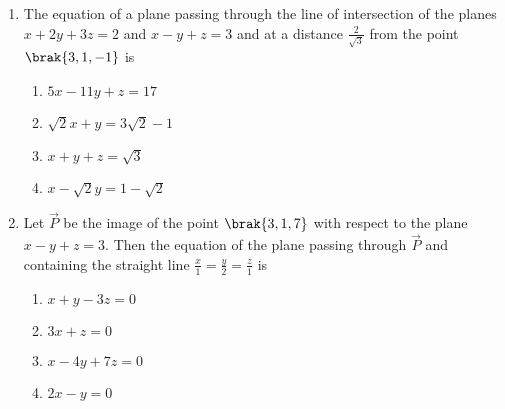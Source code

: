 \begin{enumerate}[label=\thesubsection.\arabic*.,ref=\thesubsection.\theenumi]
\begin{multicols}{4}
\begin{enumerate}
	\item $\frac{1}{\sqrt{2}}$           
	\item $\sqrt{2}$                   
        \item $2$           
	\item $2\sqrt{2}$
\end{enumerate}
\end{multicols}
         \item %
		 The equation of a plane passing through the line of intersection of the planes $x+2y+3z=2$ and $x-y+z=3$ and at a distance $\frac{2}{\sqrt{3}}$ from the point $\brak{3,1,-1}$ is 

		 \hfill{}
\begin{multicols}{2}
\begin{enumerate}
        \item $5x-11y+z=17$           
	\item $\sqrt{2}x+y=3\sqrt{2}-1$                   
	\item $x+y+z=\sqrt{3}$           
	\item $x-\sqrt{2}y=1-\sqrt{2}$
\end{enumerate}
\end{multicols}
         \item %
		 Let $\vec{P}$ be the image of the point $\brak{3,1,7}$ with respect to the plane $x-y+z=3$. Then the equation of the plane passing through $\vec{P}$ and containing the straight line $\frac{x}{1}=\frac{y}{2}=\frac{z}{1}$ is \hfill{}
\begin{multicols}{2}
\begin{enumerate}
        \item $x+y-3z=0$                             
        \item $3x+z=0$                           
        \item $x-4y+7z=0$            
        \item $2x-y=0$
\end{enumerate}
\end{multicols}


\end{enumerate}
